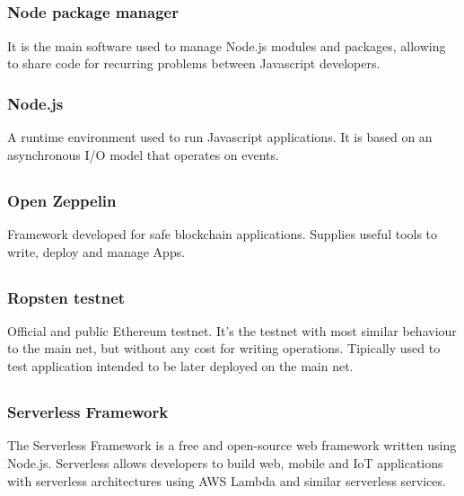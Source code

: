 	\subsection*{}
		\subsubsection*{Node package manager}
			It is the main software used to manage Node.js modules and packages, allowing to share code for recurring problems between Javascript developers.
		\subsubsection*{Node.js}
			A runtime environment used to run Javascript applications. It is based on an asynchronous I/O model that operates on events.
	
	\subsection*{}
		\subsubsection*{Open Zeppelin}
			Framework developed for safe blockchain applications. Supplies useful tools to write, deploy and manage \DJ{}Apps.
	\subsection*{}
		\subsubsection*{Ropsten testnet}
			Official and public Ethereum testnet. It's the testnet with most similar behaviour to the main net, but without any cost for writing operations. Tipically used to test application intended to be later deployed on the main net.
	\subsection*{}
		\subsubsection*{Serverless Framework}
			The Serverless Framework is a free and open-source web framework written using Node.js. Serverless allows developers to build web, mobile and IoT applications with serverless architectures using AWS Lambda and similar serverless services.

